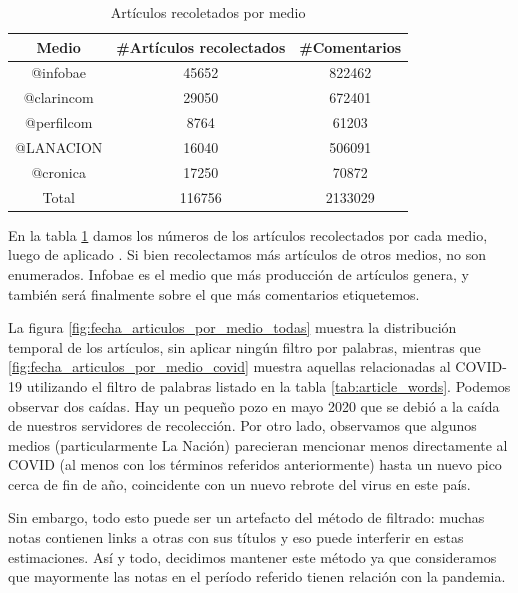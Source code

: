 \begin{table}[t]
    \centering
    \begin{tabular}{c|c|c}
    Medio      & \#Artículos recolectados & \#Comentarios \\
    \hline
    @infobae   &  45652   &  822462 \\
    @clarincom &  29050   &  672401 \\
    @perfilcom &  8764    &  61203  \\
    @LANACION  &  16040   &  506091 \\
    @cronica   &  17250   &  70872 \\
    \hline
    Total      & 116756  & 2133029 \\
    \end{tabular}
    \caption{Artículos recoletados por medio}
    \label{tab:articulos_recoletados_por_medio}
\end{table}


En la tabla \ref{tab:articulos_recoletados_por_medio} damos los números de los artículos recolectados por cada medio, luego de aplicado . Si bien recolectamos más artículos de otros medios, no son enumerados. Infobae es el medio que más producción de artículos genera, y también será finalmente sobre el que más comentarios etiquetemos.

La figura \ref{fig:fecha_articulos_por_medio_todas} muestra la distribución temporal de los artículos, sin aplicar ningún filtro por palabras, mientras que \ref{fig:fecha_articulos_por_medio_covid} muestra aquellas relacionadas al COVID-19 utilizando el filtro de palabras listado en la tabla \ref{tab:article_words}. Podemos observar dos caídas. Hay un pequeño pozo en mayo 2020 que se debió a la caída de nuestros servidores de recolección. Por otro lado, observamos que algunos medios (particularmente La Nación) parecieran mencionar menos directamente al COVID (al menos con los términos referidos anteriormente) hasta un nuevo pico cerca de fin de año, coincidente con un nuevo rebrote del virus en este país.

Sin embargo, todo esto puede ser un artefacto del método de filtrado: muchas notas contienen links a otras con sus títulos y eso puede interferir en estas estimaciones. Así y todo, decidimos mantener este método ya que consideramos que mayormente las notas en el período referido tienen relación con la pandemia.

